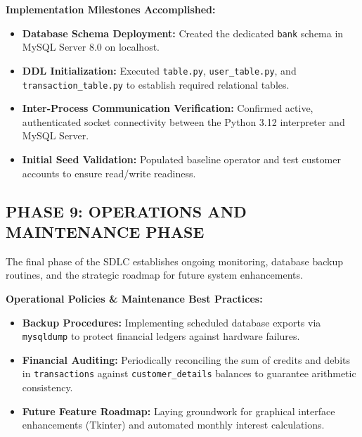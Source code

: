 \documentclass[12pt,a4paper]{article}
\begin{document}
\vspace{0.4em}
\noindent\textbf{Implementation Milestones Accomplished:}
\begin{itemize}
    \item \textbf{Database Schema Deployment:} Created the dedicated \texttt{bank} schema in MySQL Server 8.0 on localhost.
    \item \textbf{DDL Initialization:} Executed \texttt{table.py}, \texttt{user\_table.py}, and \texttt{transaction\_table.py} to establish required relational tables.
    \item \textbf{Inter-Process Communication Verification:} Confirmed active, authenticated socket connectivity between the Python 3.12 interpreter and MySQL Server.
    \item \textbf{Initial Seed Validation:} Populated baseline operator and test customer accounts to ensure read/write readiness.
\end{itemize}

\vspace{1.2em}
\subsection*{PHASE 9: OPERATIONS AND MAINTENANCE PHASE}
The final phase of the SDLC establishes ongoing monitoring, database backup routines, and the strategic roadmap for future system enhancements.

\vspace{0.4em}
\noindent\textbf{Operational Policies \& Maintenance Best Practices:}
\begin{itemize}
    \item \textbf{Backup Procedures:} Implementing scheduled database exports via \texttt{mysqldump} to protect financial ledgers against hardware failures.
    \item \textbf{Financial Auditing:} Periodically reconciling the sum of credits and debits in \texttt{transactions} against \texttt{customer\_details} balances to guarantee arithmetic consistency.
    \item \textbf{Future Feature Roadmap:} Laying groundwork for graphical interface enhancements (Tkinter) and automated monthly interest calculations.
\end{itemize}

\clearpage

\hypertarget{sec:flowchart}{}\label{sec:flowchart}
\end{document}
